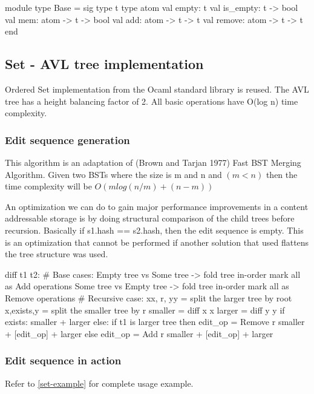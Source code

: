 \documentclass{article}
\begin{document}
\begin{longlisting}
module type Base = sig
  type t
  type atom
  val empty: t
  val is_empty: t -> bool
  val mem: atom -> t -> bool
  val add: atom -> t -> t
  val remove: atom -> t -> t
end
\end{longlisting}

\subsection{Set - AVL tree implementation}
Ordered Set implementation from the Ocaml standard library is reused. The AVL tree has a height balancing factor of 2. 
All basic operations have O(log n) time complexity.

\subsubsection{Edit sequence generation}\label{set-avlt-diff}
This algorithm is an adaptation of (Brown and Tarjan 1977) Fast BST Merging Algorithm. 
Given two BSTs where the size is m and n and $(m < n)$ then the time complexity will be $O(mlog(n/m) + (n - m))$

An optimization we can do to gain major performance improvements in a content addressable storage 
is by doing structural comparison of the child trees before recursion. Basically if s1.hash == s2.hash, 
then the edit sequence is empty. This is an optimization that cannot be performed if another solution that used 
flattens the tree structure was used.

\begin{longlisting}[python]
diff t1 t2:
  # Base cases:
     Empty tree vs Some tree -> 
     	fold tree in-order 
     	  mark all as Add operations
     Some tree vs Empty tree ->
     	fold tree in-order 
     	  mark all as Remove operations
  # Recursive case:
     xx, r, yy = split the larger tree by root
     x,exists,y = split the smaller tree by r
     smaller = diff x x
  	 larger = diff y y
     if exists: 
     	smaller + larger
     else:
     	if t1 is larger tree then 
        	edit_op = Remove r
            smaller + [edit_op] + larger
        else 
        	edit_op = Add r
        	smaller + [edit_op] + larger
\end{longlisting}

\subsubsection{Edit sequence in action}
Refer to \ref{set-example} for complete usage example.
\end{document}
